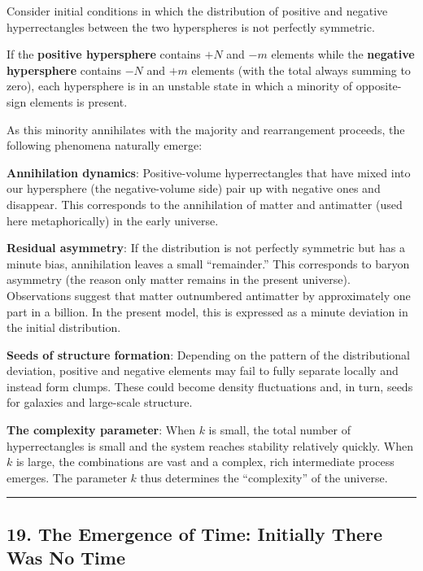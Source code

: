 \documentclass[a4paper,11pt]{article}
\theoremstyle{definition}
\begin{document}
Consider initial conditions in which the distribution of positive and
negative hyperrectangles between the two hyperspheres is not perfectly
symmetric.

If the \textbf{positive hypersphere} contains \(+N\) and \(-m\) elements
while the \textbf{negative hypersphere} contains \(-N\) and \(+m\)
elements (with the total always summing to zero), each hypersphere is in
an unstable state in which a minority of opposite-sign elements is
present.

As this minority annihilates with the majority and rearrangement
proceeds, the following phenomena naturally emerge:

\textbf{Annihilation dynamics}: Positive-volume hyperrectangles that
have mixed into our hypersphere (the negative-volume side) pair up with
negative ones and disappear. This corresponds to the annihilation of
matter and antimatter (used here metaphorically) in the early universe.

\textbf{Residual asymmetry}: If the distribution is not perfectly
symmetric but has a minute bias, annihilation leaves a small
``remainder.'' This corresponds to baryon asymmetry (the reason only
matter remains in the present universe). Observations suggest that
matter outnumbered antimatter by approximately one part in a billion. In
the present model, this is expressed as a minute deviation in the
initial distribution.

\textbf{Seeds of structure formation}: Depending on the pattern of the
distributional deviation, positive and negative elements may fail to
fully separate locally and instead form clumps. These could become
density fluctuations and, in turn, seeds for galaxies and large-scale
structure.

\textbf{The complexity parameter}: When \(k\) is small, the total number
of hyperrectangles is small and the system reaches stability relatively
quickly. When \(k\) is large, the combinations are vast and a complex,
rich intermediate process emerges. The parameter \(k\) thus determines
the ``complexity'' of the universe.

\begin{center}\rule{0.5\linewidth}{0.5pt}\end{center}

\subsection{19. The Emergence of Time: Initially There Was No
Time}\label{the-emergence-of-time-initially-there-was-no-time}
\end{document}
